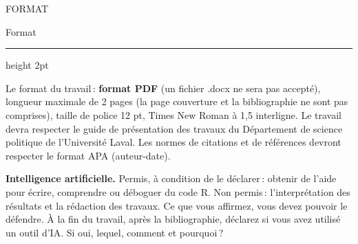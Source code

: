 \documentclass[11pt]{article}
\newcommand{\etape}[2]{%
  \par\vspace{10pt}\Needspace{4\baselineskip}%
  {\titre\small\color{rouge}#1}\par\vspace{-2pt}%
  {\titre\Large #2}\par\vspace{3pt}%
  {\color{encre}\hrule height 2pt}\vspace{6pt}}
\begin{document}
\etape{FORMAT}{Format}

Le format du travail : \textbf{format PDF} (un fichier .docx ne sera pas accepté), longueur maximale de 2 pages (la page couverture et la bibliographie ne sont pas comprises), taille de police 12 pt, Times New Roman à 1,5 interligne. Le travail devra respecter le guide de présentation des travaux du Département de science politique de l'Université Laval. Les normes de citations et de références devront respecter le format APA (auteur-date).

\begin{regle}
\textbf{Intelligence artificielle.} Permis, à condition de le déclarer : obtenir de l'aide pour écrire, comprendre ou déboguer du code R. Non permis : l'interprétation des résultats et la rédaction des travaux. Ce que vous affirmez, vous devez pouvoir le défendre. À la fin du travail, après la bibliographie, déclarez si vous avez utilisé un outil d'IA. Si oui, lequel, comment et pourquoi ?
\end{regle}
\end{document}

